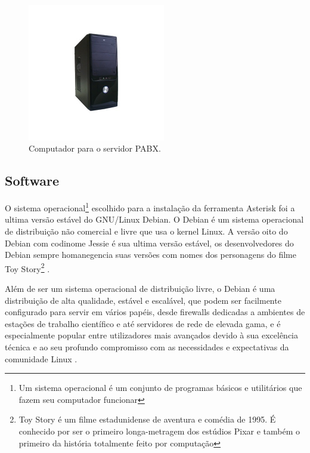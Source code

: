 \begin{figure}[h]
	\centering
	\includegraphics[width=6cm]{imagens/gabinete.jpg}
	\caption{Computador para o servidor PABX.}
    \label{Figura18}
\end{figure}

\subsection{Software}
O sistema operacional\footnote{Um sistema operacional é um conjunto de programas básicos e utilitários que fazem seu computador funcionar} escolhido para a instalação da ferramenta Asterisk foi a ultima versão estável do GNU/Linux Debian. O Debian é um sistema operacional de distribuição não comercial e livre que usa o kernel Linux. A versão oito do Debian com codinome Jessie é sua ultima versão estável, os desenvolvedores do Debian sempre homanegencia suas versões com nomes dos personagens do filme Toy Story\footnote{Toy Story é um filme estadunidense de aventura e comédia de 1995. É conhecido por ser o primeiro longa-metragem dos estúdios Pixar e também o primeiro da história totalmente feito por computação} \cite{valessiosoaresbrito2015}.

Além de ser um sistema operacional de distribuição livre, o Debian é uma distribuição de alta qualidade, estável e escalável, que podem ser facilmente configurado para servir em vários papéis, desde firewalls dedicadas a ambientes de estações de trabalho científico e até servidores de rede de elevada gama, e é especialmente popular entre utilizadores mais avançados devido à sua excelência técnica e ao seu profundo compromisso com as necessidades e expectativas da comunidade Linux \cite{valessiosoaresbrito2015}.

